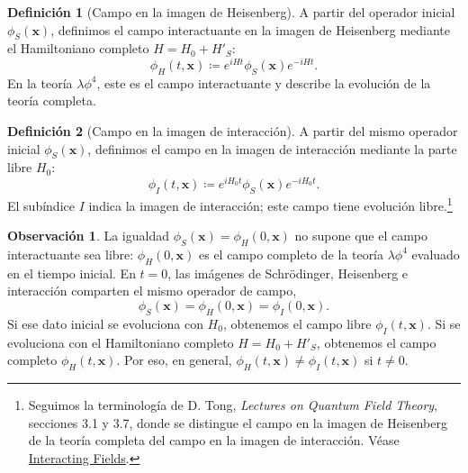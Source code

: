\documentclass[11pt,letterpaper]{article}
\theoremstyle{definition}
\newtheorem{definicion}{Definición}
\theoremstyle{definition}
\newtheorem{observacion}{Observación}
\newcommand{\eqbox}[1]{\boxed{\displaystyle #1}}
\begin{document}
\begin{definicion}[Campo en la imagen de Heisenberg]
A partir del operador inicial $\phi_S(\mathbf{x})$, definimos el campo
interactuante en la imagen de Heisenberg mediante el Hamiltoniano completo
$H=H_0+H'_S$:
\begin{equation}
  \eqbox{\phi_H(t,\mathbf{x})\coloneqq
    e^{iHt}\phi_S(\mathbf{x})e^{-iHt}.}
  \label{eq:fieldHeisenberg}
\end{equation}
En la teoría $\lambda\phi^4$, este es el campo interactuante y describe la
evolución de la teoría completa.
\end{definicion}

\begin{definicion}[Campo en la imagen de interacción]
A partir del mismo operador inicial $\phi_S(\mathbf{x})$, definimos el campo
en la imagen de interacción mediante la parte libre $H_0$:
\begin{equation}
  \eqbox{\phi_I(t,\mathbf{x})\coloneqq
    e^{iH_0t}\phi_S(\mathbf{x})e^{-iH_0t}.}
  \label{eq:fieldInteraction}
\end{equation}
El subíndice $I$ indica la imagen de interacción; este campo tiene evolución
libre.\footnote{Seguimos la terminología de D. Tong,
\emph{Lectures on Quantum Field Theory}, secciones 3.1 y 3.7, donde se
distingue el campo en la imagen de Heisenberg de la teoría completa del campo
en la imagen de interacción. Véase
\href{https://www.damtp.cam.ac.uk/user/tong/qft/qfthtml/S3.html}{Interacting Fields}.}
\end{definicion}

\begin{observacion}
La igualdad \(\phi_S(\mathbf{x})=\phi_H(0,\mathbf{x})\) no supone que el campo
interactuante sea libre: \(\phi_H(0,\mathbf{x})\) es el campo completo de la
teoría \(\lambda\phi^4\) evaluado en el tiempo inicial. En \(t=0\), las
imágenes de Schrödinger, Heisenberg e interacción comparten el mismo operador de
campo,
\begin{equation}
  \phi_S(\mathbf{x})=\phi_H(0,\mathbf{x})=\phi_I(0,\mathbf{x}).
\end{equation}
Si ese dato inicial se evoluciona con \(H_0\), obtenemos el campo libre
\(\phi_I(t,\mathbf{x})\). Si se evoluciona con el Hamiltoniano completo
\(H=H_0+H'_S\), obtenemos el campo completo \(\phi_H(t,\mathbf{x})\). Por eso, en
general, \(\phi_H(t,\mathbf{x})\neq\phi_I(t,\mathbf{x})\) si \(t\neq0\).
\end{observacion}
\end{document}
